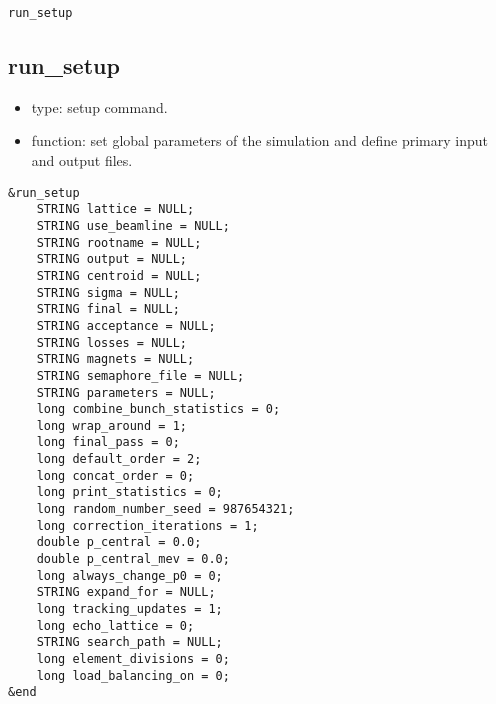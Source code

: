 \documentclass[11pt]{article}
\begin{document}
\begin{latexonly}
\newpage
\begin{center}{\Large\verb|run_setup|}\end{center}
\end{latexonly}
\subsection{run\_setup \label{subsec:runsetup}}

\begin{itemize}
\item type: setup command.
\item function: set global parameters of the simulation and define primary input and output files.
\end{itemize}

\begin{verbatim}
&run_setup
    STRING lattice = NULL;
    STRING use_beamline = NULL;
    STRING rootname = NULL;
    STRING output = NULL;
    STRING centroid = NULL;
    STRING sigma = NULL;
    STRING final = NULL;
    STRING acceptance = NULL;
    STRING losses = NULL;
    STRING magnets = NULL;
    STRING semaphore_file = NULL;
    STRING parameters = NULL;
    long combine_bunch_statistics = 0;
    long wrap_around = 1;
    long final_pass = 0;
    long default_order = 2;
    long concat_order = 0;
    long print_statistics = 0;
    long random_number_seed = 987654321;
    long correction_iterations = 1;
    double p_central = 0.0;
    double p_central_mev = 0.0;
    long always_change_p0 = 0;
    STRING expand_for = NULL; 
    long tracking_updates = 1;
    long echo_lattice = 0;
    STRING search_path = NULL;
    long element_divisions = 0;
    long load_balancing_on = 0;
&end
\end{verbatim}
\end{document}
